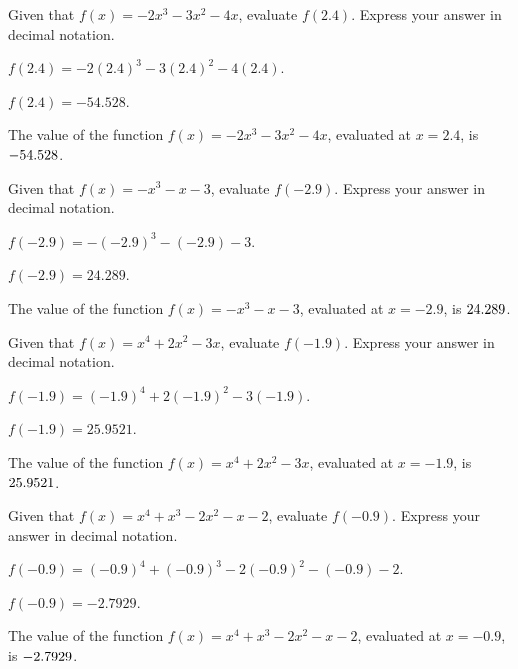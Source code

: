 \begin{shuffle}
\begin{exercise}
Given that $f(x)=-2 x^3-3 x^2-4 x$, evaluate $f(2.4)$. Express your answer in decimal notation.
\begin{solution}
\begin{hint}
$f(2.4)=-2 (2.4)^3-3 (2.4)^2-4 (2.4)$.
\end{hint}
\begin{hint}
$f(2.4)=-54.528$.
\end{hint}
The value of the function $f(x) = -2 x^3-3 x^2-4 x$, evaluated at $x=2.4$, is ${-54.528}$.
\end{solution}
\end{exercise}

\begin{exercise}
Given that $f(x)=-x^3-x-3$, evaluate $f(-2.9)$. Express your answer in decimal notation.
\begin{solution}
\begin{hint}
$f(-2.9)=-(-2.9)^3-(-2.9)-3$.
\end{hint}
\begin{hint}
$f(-2.9)=24.289$.
\end{hint}
The value of the function $f(x) = -x^3-x-3$, evaluated at $x=-2.9$, is ${24.289}$.
\end{solution}
\end{exercise}

\begin{exercise}
Given that $f(x)=x^4+2 x^2-3 x$, evaluate $f(-1.9)$. Express your answer in decimal notation.
\begin{solution}
\begin{hint}
$f(-1.9)=(-1.9)^4+2 (-1.9)^2-3 (-1.9)$.
\end{hint}
\begin{hint}
$f(-1.9)=25.9521$.
\end{hint}
The value of the function $f(x) = x^4+2 x^2-3 x$, evaluated at $x=-1.9$, is ${25.9521}$.
\end{solution}
\end{exercise}

\begin{exercise}
Given that $f(x)=x^4+x^3-2 x^2-x-2$, evaluate $f(-0.9)$. Express your answer in decimal notation.
\begin{solution}
\begin{hint}
$f(-0.9)=(-0.9)^4+(-0.9)^3-2 (-0.9)^2-(-0.9)-2$.
\end{hint}
\begin{hint}
$f(-0.9)=-2.7929$.
\end{hint}
The value of the function $f(x) = x^4+x^3-2 x^2-x-2$, evaluated at $x=-0.9$, is ${-2.7929}$.
\end{solution}
\end{exercise}


\end{shuffle}
